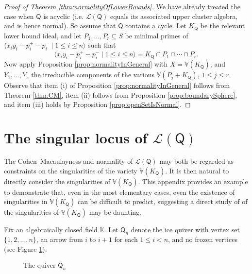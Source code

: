 \documentclass[10pt]{amsart}
\numberwithin{equation}{section}
\theoremstyle{definition}
\theoremstyle{remark}
\renewcommand{\L}{\mathcal{L}}%
\newcommand{\1}{^{-1}}
\def\Q{\mathsf{Q}}
\begin{document}
\begin{proof}[Proof of Theorem \ref{thm:normalityOfLowerBounds}]
We have already treated the case when $\Q$ is acyclic (i.e. $\mathcal{L}(\Q)$ equals its associated upper cluster algebra, and is hence normal). So assume that $\Q$ contains a cycle.
Let $K_\Q$ be the relevant lower bound ideal, and let $P_1,\dots, P_r\subseteq S$ be minimal primes of $\langle x_iy_i-p_i^+-p_i^-\mid 1\leq i\leq n \rangle$ such that 
\[
\langle x_iy_i-p_i^+-p_i^-\mid 1\leq i\leq n \rangle = K_\Q\cap P_1\cap\cdots \cap P_r.
\]
Now apply Proposition \ref{prop:normalityInGeneral} with $X = \mathbb{V}(K_\Q)$, and $Y_1,\dots,Y_s$ the irreducible components of the various $\mathbb{V}(P_j + K_\Q)$, $1\leq j\leq r$. Observe that item (i) of Proposition \ref{prop:normalityInGeneral} follows from Theorem \ref{thm:CM}, item (ii) follows from Proposition \ref{prop:boundarySphere}, and item (iii) holds by Proposition \ref{prop:openSetIsNormal}.
\end{proof}

\appendix

\section{The singular locus of $\L(\Q)$}\label{section: singularity}

The Cohen--Macaulayness and normality of $\L(\Q)$ may both be regarded as constraints on the singularities of the variety $\mathbb{V}(K_\Q)$.  It is then natural to directly consider the singularities of $\mathbb{V}(K_\Q)$.
This appendix provides an example to demonstrate that, even in the most elementary cases, even the existence of singularities in $\mathbb{V}(K_\Q)$ can be difficult to predict, suggesting a direct study of of the singularities of $\mathbb{V}(K_\Q)$ may be daunting.

Fix an algebraically closed field $\mathbb{K}$.
Let $\Q_n$ denote the ice quiver with vertex set $\{1,2,\dots,n\}$, an arrow from $i$ to $i+1$ for each $1\leq i <n$, and no frozen vertices (see Figure \ref{fig: Atype}).  

\begin{figure}[h!t]
\caption{The quiver $\Q_n$}
\label{fig: Atype}
\end{figure}
\end{document}
